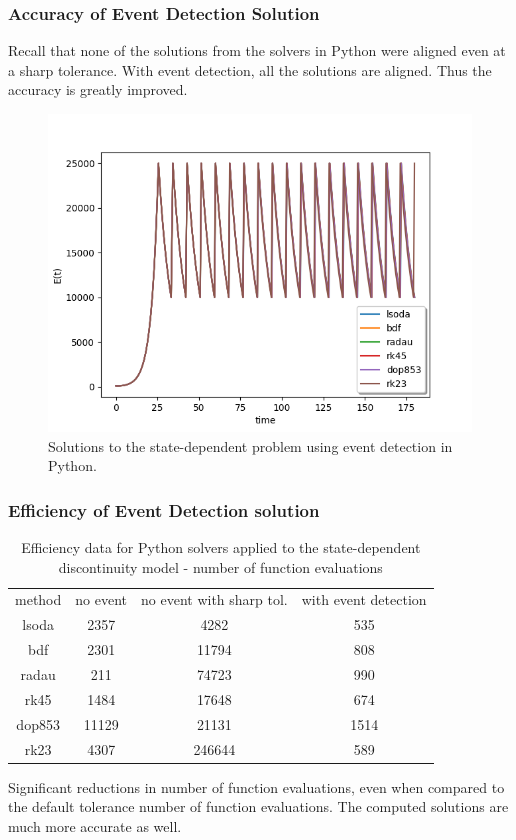 \documentclass{beamer}
\begin{document}
\begin{frame}
\frametitle{Accuracy of Event Detection Solution}
Recall that none of the solutions from the solvers in Python were aligned even at a sharp tolerance.
With event detection, all the solutions are aligned. Thus the accuracy is greatly improved.
\begin{figure}[H]
    \centering
    \includegraphics[width=0.7\linewidth]{./figures/solve_state_discontinuity_py}
    \caption{Solutions to the state-dependent problem using event detection in Python.}
    \label{fig:solve_state_discontinuity_py}
    \end{figure}
\end{frame}

\begin{frame}
\frametitle{Efficiency of Event Detection solution}
\begin{table}[h]
    \caption {Efficiency data for Python solvers applied to the state-dependent discontinuity model - number of function evaluations} \label{tab:state_discontinuity_Py}
    \begin{center}
    \begin{tabular}{ c c c c } 
    method & no event & no event with sharp tol. & with event detection \\ 
    lsoda & 2357 & 4282 & 535 \\
    bdf & 2301 & 11794 & 808 \\
    radau & 211 & 74723 & 990 \\
    rk45 & 1484 & 17648 & 674 \\
    dop853 & 11129 & 21131 & 1514 \\
    rk23 & 4307 & 246644 & 589 \\
    \end{tabular}
    \end{center}
\end{table}
Significant reductions in number of function evaluations, even when compared to the default tolerance number of function evaluations. The computed solutions are much more accurate as well.
\end{frame}
\end{document}
